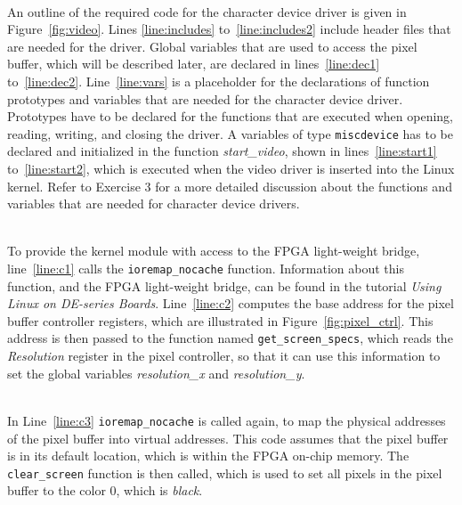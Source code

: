 \documentclass[epsfig,10pt,fullpage]{article}
\begin{document}
~\\
\noindent
An outline of the required code for the character device driver is given in 
Figure~\ref{fig:video}. Lines \ref{line:includes} to~\ref{line:includes2} include header files
that are needed for the driver. Global variables that are used to access the pixel
buffer, which will be described later, are declared in lines~\ref{line:dec1} to~\ref{line:dec2}.
Line~\ref{line:vars} is a placeholder for the declarations of function prototypes and variables
that are needed for the character device driver. Prototypes have to be declared for the functions
that are executed when opening, reading, writing, and closing the driver. A variables of type 
\texttt{miscdevice} has to be declared and initialized in
the function {\it start\_video}, shown in lines~\ref{line:start1} to~\ref{line:start2},
which is executed when the video driver is inserted into the Linux kernel. Refer to Exercise 3 
for a more detailed discussion about the functions and variables that are needed for character
device drivers.

~\\
\noindent
To provide the kernel module with access to the FPGA light-weight bridge, line~\ref{line:c1} 
calls the \texttt{ioremap\_nocache} function. Information about this function, and the
FPGA light-weight bridge, can be found in the tutorial {\it Using Linux on DE-series Boards}.
Line~\ref{line:c2} computes the base address for the pixel buffer controller registers, 
which are illustrated in Figure~\ref{fig:pixel_ctrl}. This address is then passed to the
function named \texttt{get\_screen\_specs}, which reads the {\it Resolution} register in
the pixel controller, so that it can use this information to set the global variables 
{\it resolution\_x} and {\it resolution\_y}.

~\\
\noindent
In Line~\ref{line:c3} \texttt{ioremap\_nocache} is called again, to map the physical
addresses of the pixel buffer into virtual addresses. This code assumes that the pixel
buffer is in its default location, which is within the FPGA on-chip memory. The
\texttt{clear\_screen} function is then called, which is used to set all pixels in the
pixel buffer to the color 0, which is {\it black}. 
\end{document}
